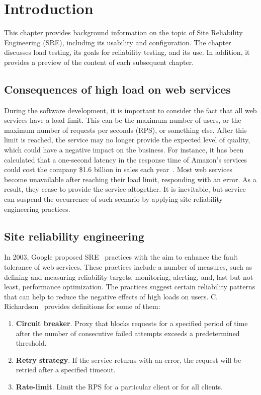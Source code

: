 \chapter{Introduction}
\label{ch:intro}

This chapter provides background information on the topic of Site Reliability Engineering (SRE), including its usability and configuration. The chapter discusses load testing, its goals for reliability testing, and its use. In addition, it provides a preview of the content of each subsequent chapter.


\section{Consequences of high load on web services}\label{sec:consequences-of-high-load-on-web-services}
During the software development, it is important to consider the fact that all web services have a load limit. This can be the maximum number of users, or the maximum number of requests per seconds (RPS), or something else. After this limit is reached, the service may no longer provide the expected level of quality, which could have a negative impact on the business. For instance, it has been calculated that a one-second latency in the response time of Amazon's services could cost the company \$1.6 billion in sales each year~\cite{one_second_article}.
Most web services become unavailable after reaching their load limit, responding with an error. As a result, they cease to provide the service altogether. It is inevitable, but service can suspend the occurrence of such scenario by applying site-reliability engineering practices.



\section{Site reliability engineering}\label{sec:site-reliability-engineering}
In 2003, Google proposed SRE~\cite{google_sre} practices with the aim to enhance the fault tolerance of web services. These practices include a number of measures, such as defining and measuring reliability targets, monitoring, alerting, and, last but not least, performance optimization. The practices suggest certain reliability patterns that can help to reduce the negative effects of high loads on users.
C. Richardson~\cite{microservices} provides definitions for some of them:
\begin{enumerate}
    \item \textbf{Circuit breaker}. Proxy that blocks requests for a specified period of time after the number of consecutive failed attempts exceeds a predetermined threshold.
    \item \textbf{Retry strategy}. If the service returns with an error, the request will be retried after a specified timeout.
    \item \textbf{Rate-limit}. Limit the RPS for a particular client or for all clients.
\end{enumerate}

